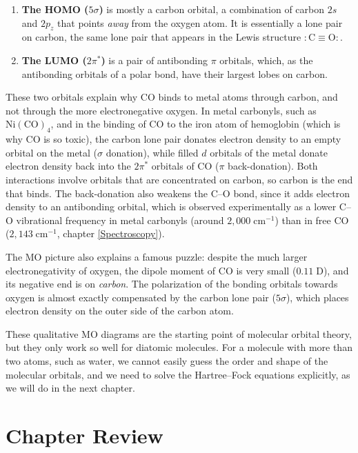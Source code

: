 \documentclass[
  english,
  9pt,
]{extbook}
\providecommand{\tightlist}{%
  \setlength{\itemsep}{0pt}\setlength{\parskip}{0pt}}
\theoremstyle{definition}
\theoremstyle{definition}
\theoremstyle{definition}
\theoremstyle{definition}
\theoremstyle{remark}
\begin{document}
\begin{enumerate}
\def\labelenumi{\arabic{enumi}.}
\tightlist
\item
  \textbf{The HOMO (\(5\sigma\))} is mostly a carbon orbital, a combination of carbon \(2s\) and \(2p_z\) that points \emph{away} from the oxygen atom. It is essentially a lone pair on carbon, the same lone pair that appears in the Lewis structure \(:\mathrm{C}\equiv\mathrm{O}:\).
\item
  \textbf{The LUMO (\(2\pi^*\))} is a pair of antibonding \(\pi\) orbitals, which, as the antibonding orbitals of a polar bond, have their largest lobes on carbon.
\end{enumerate}

These two orbitals explain why CO binds to metal atoms through carbon, and not through the more electronegative oxygen. In metal carbonyls, such as \(\mathrm{Ni(CO)_4}\), and in the binding of CO to the iron atom of hemoglobin (which is why CO is so toxic), the carbon lone pair donates electron density to an empty orbital on the metal (\(\sigma\) donation), while filled \(d\) orbitals of the metal donate electron density back into the \(2\pi^*\) orbitals of CO (\(\pi\) back-donation). Both interactions involve orbitals that are concentrated on carbon, so carbon is the end that binds. The back-donation also weakens the C--O bond, since it adds electron density to an antibonding orbital, which is observed experimentally as a lower C--O vibrational frequency in metal carbonyls (around \(2{,}000\;\text{cm}^{-1}\)) than in free CO (\(2{,}143\;\text{cm}^{-1}\), chapter \ref{Spectroscopy}).

The MO picture also explains a famous puzzle: despite the much larger electronegativity of oxygen, the dipole moment of CO is very small (\(0.11\;\text{D}\)), and its negative end is on \emph{carbon}. The polarization of the bonding orbitals towards oxygen is almost exactly compensated by the carbon lone pair (\(5\sigma\)), which places electron density on the outer side of the carbon atom.

These qualitative MO diagrams are the starting point of molecular orbital theory, but they only work so well for diatomic molecules. For a molecule with more than two atoms, such as water, we cannot easily guess the order and shape of the molecular orbitals, and we need to solve the Hartree--Fock equations explicitly, as we will do in the next chapter.

\section{Chapter Review}\label{rev11}
\end{document}
